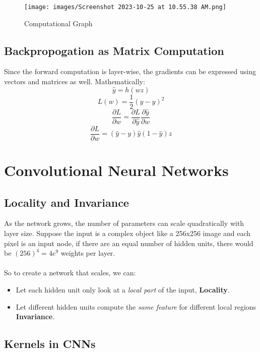 \documentclass[12pt, a4paper]{book}
\begin{document}
\begin{figure}[!htb]
    \centering
    \texttt{[image: images/Screenshot 2023-10-25 at 10.55.38 AM.png]}
    \caption{Computational Graph}
    \label{fig:parity}
\end{figure}

\subsection{Backpropogation as Matrix Computation}
Since the forward computation is layer-wise, the gradients can be expressed using vectors and matrices as well. Mathematically:
$$\hat{y} = h(wz)$$
$$L(w) = \frac{1}{2}\left(y - \hat{y}\right)^2$$
$$\frac{\partial L}{\partial w} = \frac{\partial L}{\partial \hat{y}}\frac{\partial \hat{y}}{\partial w}$$
$$\frac{\partial L}{\partial w} = (\hat{y} - y)\hat{y}(1-\hat{y})z$$

\section{Convolutional Neural Networks}

\subsection{Locality and Invariance}
As the network grows, the number of parameters can scale quadratically with layer size. Suppose the input is a complex object like a 256x256 image and each pixel is an input node, if there are an equal number of hidden units, there would be $(256)^4=4e^9$ weights per layer.\\\\
So to create a network that scales, we can:
\begin{itemize}
    \item Let each hidden unit only look at a \textit{local part} of
the input, \textbf{Locality}.
    \item Let different hidden units compute the \textit{same
feature} for different local regions \textbf{Invariance}.
\end{itemize}

\subsection{Kernels in CNNs}
\end{document}
